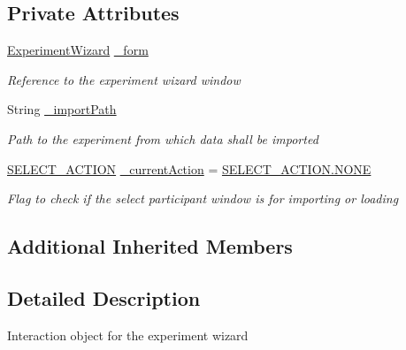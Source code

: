 \subsection*{Private Attributes}
\begin{DoxyCompactItemize}
\item 
\hyperlink{class_web_analyzer_1_1_u_i_1_1_experiment_wizard}{Experiment\+Wizard} \hyperlink{class_web_analyzer_1_1_u_i_1_1_interaction_objects_1_1_experiment_wizard_obj_a28ba1f710b9aa6bc477784dc03994b75}{\+\_\+form}
\begin{DoxyCompactList}\small\item\em Reference to the experiment wizard window \end{DoxyCompactList}\item 
String \hyperlink{class_web_analyzer_1_1_u_i_1_1_interaction_objects_1_1_experiment_wizard_obj_ac39fd1cef0cdfe82f059db09b97cc0f2}{\+\_\+import\+Path}
\begin{DoxyCompactList}\small\item\em Path to the experiment from which data shall be imported \end{DoxyCompactList}\item 
\hyperlink{class_web_analyzer_1_1_u_i_1_1_interaction_objects_1_1_experiment_wizard_obj_a8d68b0ff79197613c58d75f6323bb6ba}{S\+E\+L\+E\+C\+T\+\_\+\+A\+C\+T\+I\+O\+N} \hyperlink{class_web_analyzer_1_1_u_i_1_1_interaction_objects_1_1_experiment_wizard_obj_a2b5cdca2be4cecb230b3107d69ddd322}{\+\_\+current\+Action} = \hyperlink{class_web_analyzer_1_1_u_i_1_1_interaction_objects_1_1_experiment_wizard_obj_a8d68b0ff79197613c58d75f6323bb6baab50339a10e1de285ac99d4c3990b8693}{S\+E\+L\+E\+C\+T\+\_\+\+A\+C\+T\+I\+O\+N.\+N\+O\+N\+E}
\begin{DoxyCompactList}\small\item\em Flag to check if the select participant window is for importing or loading \end{DoxyCompactList}\end{DoxyCompactItemize}
\subsection*{Additional Inherited Members}


\subsection{Detailed Description}
Interaction object for the experiment wizard 



